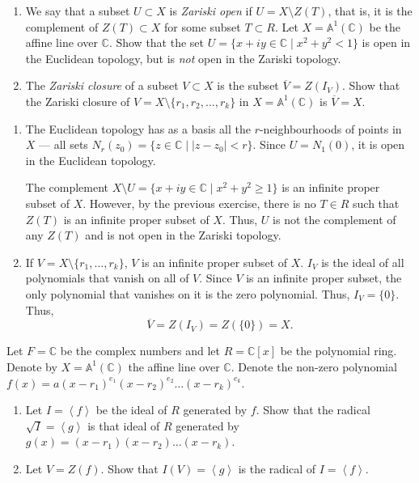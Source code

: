 \documentclass[12 pt, letterpaper]{hmcpset}
\begin{document}
\pagebreak

\begin{problem}[Problem 2.]
	\begin{enumerate}
		\item We say that a subset $U \subset X$ is \emph{Zariski open} if $U = X \setminus Z(T)$, that is, it is the complement of $Z(T) \subset X$ for some subset $T \subset R$. Let $X = \mathbb{A}^{1}(\mathbb{C})$ be the affine line over $\mathbb{C}$. Show that the set $U = \{ x + i y \in \mathbb{C} \mid x^{2} + y^{2} < 1 \}$ is open in the Euclidean topology, but is \emph{not} open in the Zariski topology.
		\item The \emph{Zariski closure} of a subset $V \subset X$ is the subset $\overline{V} = Z(I_{V})$. Show that the Zariski closure of $V = X \setminus \{ r_{1}, r_{2}, \dots, r_{k} \}$ in $X = \mathbb{A}^{1}(\mathbb{C})$ is $\overline{V} = X$.
	\end{enumerate}
\end{problem}

\begin{solution}
	\begin{enumerate}
		\item The Euclidean topology has as a basis all the $r$-neighbourhoods of points in $X$ --- all sets $N_{r}(z_{0}) = \{ z \in \mathbb{C} \mid \lvert z - z_{0} \rvert < r \}$. Since $U = N_{1}(0)$, it is open in the Euclidean topology.

			The complement $X \setminus U = \{ x + i y \in \mathbb{C} \mid x^{2} + y^{2} \ge 1 \}$ is an infinite proper subset of $X$. However, by the previous exercise, there is no $T \in R$ such that $Z(T)$ is an infinite proper subset of $X$. Thus, $U$ is not the complement of any $Z(T)$ and is not open in the Zariski topology.
		\item If $V = X \setminus \{ r_{1}, \dots, r_{k} \}$, $V$ is an infinite proper subset of $X$. $I_{V}$ is the ideal of all polynomials that vanish on all of $V$. Since $V$ is an infinite proper subset, the only polynomial that vanishes on it is the zero polynomial. Thus, $I_{V} = \{ 0 \}$. Thus,
			\[
				\overline{V} = Z(I_{V}) = Z(\{ 0 \}) = X.
			\]
	\end{enumerate}
\end{solution}

\pagebreak

\begin{problem}[Problem 3.]
	Let $F = \mathbb{C}$ be the complex numbers and let $R = \mathbb{C}[x]$ be the polynomial ring. Denote by $X = \mathbb{A}^{1}(\mathbb{C})$ the affine line over $\mathbb{C}$. Denote the non-zero polynomial $f(x) = a (x - r_{1})^{e_{1}} (x - r_{2})^{e_{2}} \dots (x - r_{k})^{e_{k}}$.
	\begin{enumerate}
		\item Let $I = \left < f \right >$ be the ideal of $R$ generated by $f$. Show that the radical $\sqrt{I} = \left < g \right >$ is that ideal of $R$ generated by $g(x) = (x - r_{1})(x - r_{2}) \dots (x - r_{k})$.
		\item Let $V = Z(f)$. Show that $I(V) = \left < g \right >$ is the radical of $I = \left < f \right >$.
	\end{enumerate}
\end{problem}
\end{document}
